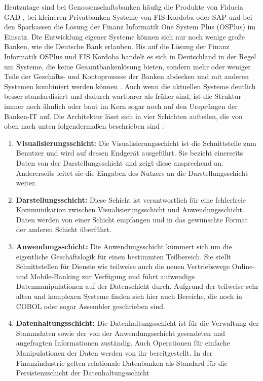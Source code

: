 \documentclass[12pt,oneside,a4paper,parskip]{scrbook}
\begin{document}
Heutzutage sind bei Genossenschaftsbanken häufig die Produkte von Fiducia GAD \cite{fiducia}, bei kleineren Privatbanken Systeme von FIS Kordoba \cite{kordoba} oder SAP \cite{SAP} und bei den Sparkassen die Lösung der Finanz Informatik One System Plus (OSPlus) \cite{finanzinformatik} im Einsatz. Die Entwicklung eigener Systeme können sich nur noch wenige große Banken, wie die Deutsche Bank erlauben. Bis auf die Lösung der Finanz Informatik OSPlus und FIS Kordoba handelt es sich in Deutschland in der Regel um Systeme, die keine Gesamtbankenlösung bieten, sondern mehr oder weniger Teile der Geschäfts- und Kontoprozesse der Banken abdecken und mit anderen Systemen kombiniert werden können \cite{einfuehrungKernbanksystem}\cite[56-58]{ITidF}. Auch wenn die aktuellen Systeme deutlich besser standardisiert und dadurch wartbarer als früher sind, ist die Struktur immer noch ähnlich oder baut im Kern sogar noch auf den Ursprüngen der Banken-IT auf. Die Architektur lässt sich in vier Schichten aufteilen, die von oben nach unten folgendermaßen beschrieben sind \cite[104]{ITidF}:

\begin{enumerate}
\item \textbf{Visualisierungsschicht:} Die Visualisierungsschicht ist die Schnittstelle zum Benutzer und wird auf dessen Endgerät ausgeführt. Sie bezieht einerseits Daten von der Darstellungsschicht und zeigt diese ansprechend an. Andererseits leitet sie die Eingaben des Nutzers an die Darstellungsschicht weiter.
\item \textbf{Darstellungsschicht:} Diese Schicht ist verantwortlich für eine fehlerfreie Kommunikation zwischen Visualisierungsschicht und Anwendungsschicht. Daten werden von einer Schicht empfangen und in das gewünschte Format der anderen Schicht überführt.
\item \textbf{Anwendungsschicht:} Die Anwendungsschicht kümmert sich um die eigentliche Geschäftslogik für einen bestimmten Teilbereich. Sie stellt Schnittstellen für Dienste wie teilweise auch die neuen Vertriebswege Online- und Mobile-Banking zur Verfügung und führt aufwendige Datenmanipulationen auf der Datenschicht durch. Aufgrund der teilweise sehr alten und komplexen Systeme finden sich hier auch Bereiche, die noch in COBOL oder sogar Assembler geschrieben sind.
\item \textbf{Datenhaltungsschicht:} Die Datenhaltungsschicht ist für die Verwaltung der Stammdaten sowie der von der Anwendungsschicht gesendeten und angefragten Informationen zuständig. Auch Operationen für einfache Manipulationen der Daten werden von ihr bereitgestellt. In der Finanzindustrie gelten relationale Datenbanken als Standard für die Persistenzschicht der Datenhaltungsschicht \cite[105]{ITidF}\cite{MarkstudieKernbankensysteme}
\end{enumerate}
\end{document}
